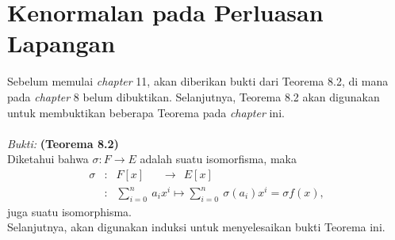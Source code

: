 

\chapter{Kenormalan pada Perluasan Lapangan}
	Sebelum memulai \textit{chapter} 11, akan diberikan bukti dari Teorema 8.2, di mana pada \textit{chapter} 8 belum dibuktikan. Selanjutnya, Teorema 8.2 akan digunakan untuk membuktikan beberapa Teorema pada \textit{chapter} ini.
\\ \\	\textit{Bukti: }\textbf{(Teorema 8.2)}\\
	Diketahui bahwa $\sigma : F \longrightarrow E$ adalah suatu isomorfisma, maka 
	$$\begin{array}{rcl}
	\sigma &:& F[x] ~~~~~~~\longrightarrow~~ E[x]\\
	&:&\sum^{n}_{i=0} \ a_ix^i \mapsto \sum^{n}_{i=0} \ \sigma (a_i)x^i=\sigma f(x),
	\end{array}$$ juga suatu isomorphisma.
\\	Selanjutnya, akan digunakan induksi untuk menyelesaikan bukti Teorema ini.
